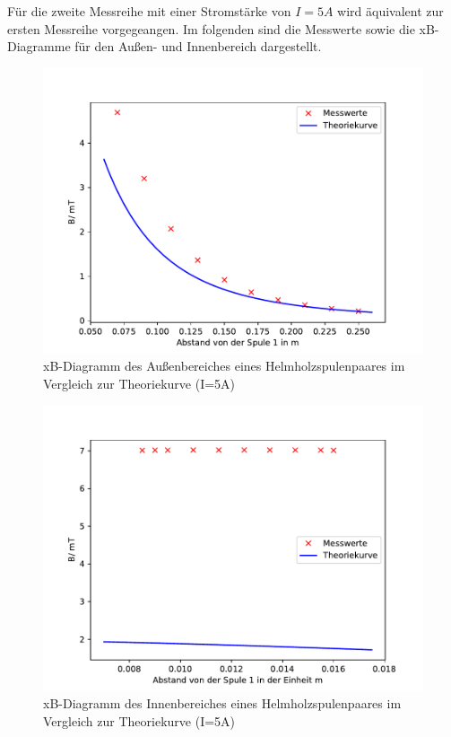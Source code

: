 Für die zweite Messreihe mit einer Stromstärke von
$I=5A$ wird äquivalent zur ersten Messreihe vorgegeangen.
Im folgenden sind die Messwerte sowie die xB-Diagramme
für den Außen- und Innenbereich dargestellt.

\begin{figure}
  \centering
  \includegraphics{Helmholz2.pdf}
  \caption{xB-Diagramm des Außenbereiches eines
  Helmholzspulenpaares im Vergleich zur Theoriekurve
  (I=5A)}
  \label{fig:Helmholz2}
\end{figure}
\begin{figure}
  \centering
  \includegraphics{Helmholz2I.pdf}
  \caption{xB-Diagramm des Innenbereiches eines
  Helmholzspulenpaares im Vergleich zur Theoriekurve
  (I=5A)}
  \label{fif:Helmholz5I}
\end{figure}

